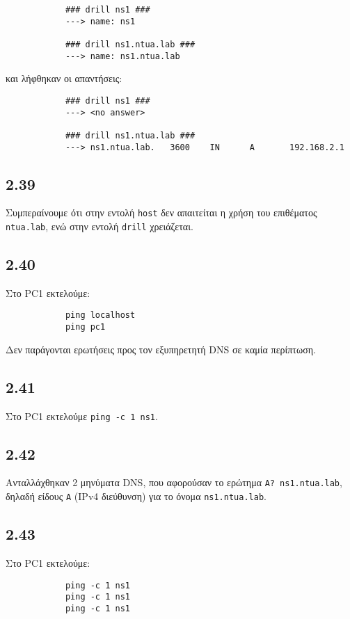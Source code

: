 \documentclass[a4paper, 12pt]{article}
\begin{document}
		\begin{verbatim}
			### drill ns1 ###
			---> name: ns1
			
			### drill ns1.ntua.lab ###
			---> name: ns1.ntua.lab
		\end{verbatim} 
		
		και λήφθηκαν οι απαντήσεις:
		
		\begin{verbatim}
			### drill ns1 ###
			---> <no answer>
			
			### drill ns1.ntua.lab ###
			---> ns1.ntua.lab.   3600    IN      A       192.168.2.1
		\end{verbatim}

	\subsection*{2.39}
		Συμπεραίνουμε ότι στην εντολή \verb|host| δεν απαιτείται η χρήση του επιθέματος \verb|ntua.lab|, ενώ στην εντολή \verb|drill| χρειάζεται.

	\subsection*{2.40}
		Στο PC1 εκτελούμε:
		
		\begin{verbatim}
			ping localhost
			ping pc1
		\end{verbatim}
		
		Δεν παράγονται ερωτήσεις προς τον εξυπηρετητή DNS σε καμία περίπτωση.

	\subsection*{2.41}
		Στο PC1 εκτελούμε \verb|ping -c 1 ns1|.

	\subsection*{2.42}
		Ανταλλάχθηκαν 2 μηνύματα DNS, που αφορούσαν το ερώτημα \verb|A? ns1.ntua.lab|, δηλαδή είδους \verb|A| (IPv4 διεύθυνση) για το όνομα \verb|ns1.ntua.lab|.  

	\subsection*{2.43}
		Στο PC1 εκτελούμε:
		
		\begin{verbatim}
			ping -c 1 ns1
			ping -c 1 ns1
			ping -c 1 ns1
		\end{verbatim}
		
\end{document}
